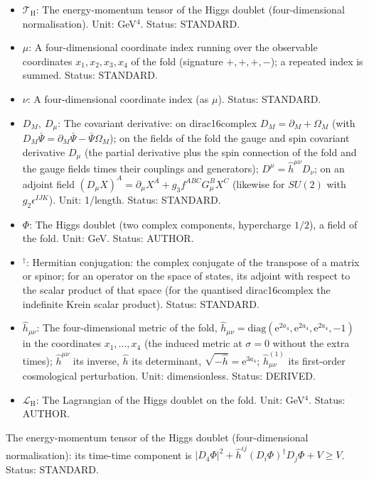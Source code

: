 \documentclass[
  10pt,
]{article}
\providecommand{\tightlist}{%
  \setlength{\itemsep}{0pt}\setlength{\parskip}{0pt}}
\begin{document}
\begin{itemize}
\tightlist
\item
  \(\mathcal{T}_{\mathrm{H}}\): The energy-momentum tensor of the Higgs
  doublet (four-dimensional normalisation). Unit: GeV\(^4\). Status:
  STANDARD.
\item
  \(\mu\): A four-dimensional coordinate index running over the
  observable coordinates \(x_1, x_2, x_3, x_4\) of the fold (signature
  \(+,+,+,-\)); a repeated index is summed. Status: STANDARD.
\item
  \(\nu\): A four-dimensional coordinate index (as \(\mu\)). Status:
  STANDARD.
\item
  \(D_M,\ D_\mu\): The covariant derivative: on dirac16complex
  \(D_M = \partial_M + \Omega_M\) (with
  \(D_M\bar\Psi = \partial_M\bar\Psi - \bar\Psi\Omega_M\)); on the
  fields of the fold the gauge and spin covariant derivative \(D_\mu\)
  (the partial derivative plus the spin connection of the fold and the
  gauge fields times their couplings and generators);
  \(D^\mu = \hat h^{\mu\nu}D_\nu\); on an adjoint field
  \((D_\mu X)^A = \partial_\mu X^A + g_3f^{ABC}G^B_\mu X^C\) (likewise
  for \(SU(2)\) with \(g_2\epsilon^{IJK}\)). Unit: 1/length. Status:
  STANDARD.
\item
  \(\Phi\): The Higgs doublet (two complex components, hypercharge
  \(1/2\)), a field of the fold. Unit: GeV. Status: AUTHOR.
\item
  \({}^\dagger\): Hermitian conjugation: the complex conjugate of the
  transpose of a matrix or spinor; for an operator on the space of
  states, its adjoint with respect to the scalar product of that space
  (for the quantised dirac16complex the indefinite Krein scalar
  product). Status: STANDARD.
\item
  \(\hat h_{\mu\nu}\): The four-dimensional metric of the fold,
  \(\hat h_{\mu\nu} = \mathrm{diag}(\mathrm{e}^{2a_4}, \mathrm{e}^{2a_4}, \mathrm{e}^{2a_4}, -1)\)
  in the coordinates \(x_1, \dots, x_4\) (the induced metric at
  \(\sigma = 0\) without the extra times); \(\hat h^{\mu\nu}\) its
  inverse, \(\hat h\) its determinant,
  \(\sqrt{-\hat h} = \mathrm{e}^{3a_4}\); \(\hat h^{(1)}_{\mu\nu}\) its
  first-order cosmological perturbation. Unit: dimensionless. Status:
  DERIVED.
\item
  \(\mathcal{L}_{\mathrm{H}}\): The Lagrangian of the Higgs doublet on
  the fold. Unit: GeV\(^4\). Status: AUTHOR.
\end{itemize}

The energy-momentum tensor of the Higgs doublet (four-dimensional
normalisation): its time-time component is
\(\lvert D_4\Phi\rvert^2 + \hat h^{ij}(D_i\Phi)^\dagger D_j\Phi + V \ge V\).
Status: STANDARD.
\end{document}
